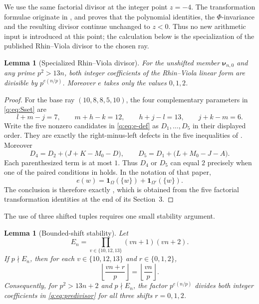 \documentclass[11pt]{amsart}
\theoremstyle{plain}
\newtheorem{lemma}[theorem]{Lemma}
\theoremstyle{remark}\newtheorem{remark}[theorem]{Remark}
\numberwithin{equation}{section}
\begin{document}
We use the same factorial divisor at the integer point $z=-4$.  The transformation formulae originate in \cite[\S\S3--4]{RV05}, and \cite[\S2]{RV19} proves that the polynomial identities, the $\Phi$-invariance and the resulting divisor continue unchanged to $z<0$.  Thus no new arithmetic input is introduced at this point; the calculation below is the specialization of the published Rhin--Viola divisor to the chosen ray.

\begin{lemma}[Specialized Rhin--Viola divisor]\label{q:lem:rv-divisor}
For the unshifted member $\boldsymbol\nu_{n,0}$ and any prime $p^2>13n$,
both integer coefficients of the Rhin--Viola linear form are divisible by
$p^{e(n/p)}$.  Moreover $e$ takes only the values $0,1,2$.
\end{lemma}

\begin{proof}
For the base ray $(10,8,8,5,10)$, the four complementary parameters in
\eqref{q:eq:Sset} are
\[
 l+m-j=7,\qquad m+h-k=12,\qquad h+j-l=13,
 \qquad j+k-m=6.
\]
Write the five nonzero candidates in \eqref{q:eq:e-def} as
$D_1,\ldots,D_5$ in their displayed order.  They are exactly the
right-minus-left defects in the five inequalities of
\cite[(4.10)]{RV05}.  Moreover
\[
 D_4=D_2+\bigl(J+K-M_0-D\bigr),\qquad
 D_5=D_1+\bigl(L+M_0-J-A\bigr).
\]
Each parenthesized term is at most $1$.  Thus $D_4$ or $D_5$ can equal $2$
precisely when one of the paired conditions in \cite[(4.11)]{RV05}
holds.  In the notation of that paper,
\begin{equation}\label{q:eq:e-Omega}
  e(w)=\mathbf1_{\Omega}(\{w\})+\mathbf1_{\Omega'}(\{w\}).
\end{equation}
The conclusion is therefore exactly \cite[Lemma 4.1]{RV05}, which is
obtained from the five factorial transformation identities at the end of its
Section~3.
\end{proof}

The use of three shifted tuples requires one small stability argument.

\begin{lemma}[Bounded-shift stability]\label{q:lem:shift-stability}
Let
\begin{equation}\label{q:eq:En}
 E_n=\prod_{v\in\{10,12,13\}}(vn+1)(vn+2).
\end{equation}
If $p\nmid E_n$, then for each $v\in\{10,12,13\}$ and
$r\in\{0,1,2\}$,
\begin{equation}\label{q:eq:floor-stability}
 \left\lfloor\frac{vn+r}{p}\right\rfloor
 =\left\lfloor\frac{vn}{p}\right\rfloor.
\end{equation}
Consequently, for $p^2>13n+2$ and $p\nmid E_n$, the factor
$p^{e(n/p)}$ divides both integer coefficients in \eqref{q:eq:predivisor}
for all three shifts $r=0,1,2$.
\end{lemma}
\end{document}
